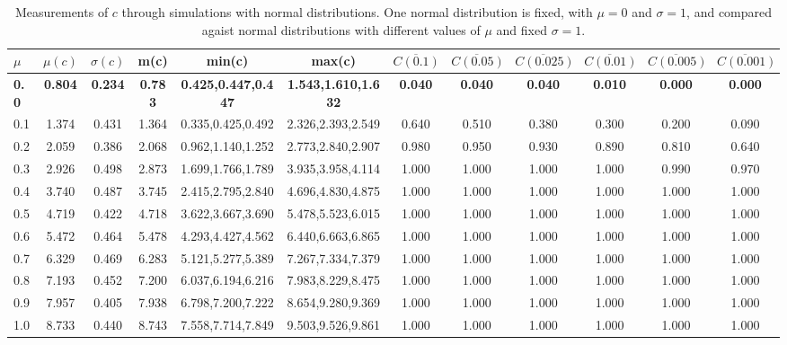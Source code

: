 \begin{table*}[h!]
\begin{center}
\begin{tabular}{| l | c | c | c | c | c | c | c | c | c | c | c |}\hline
$\mu$ & $\mu(c)$ & $\sigma(c)$ & m(c) & min(c) & max(c) & $\overline{C(0.1)}$ & $\overline{C(0.05)}$ & $\overline{C(0.025)}$ & $\overline{C(0.01)}$ & $\overline{C(0.005)}$ & $\overline{C(0.001)}$ \\\hline\hline
{\bf 0.0} & {\bf 0.804} & {\bf 0.234} & {\bf 0.783} & {\bf 0.425,0.447,0.447} & {\bf 1.543,1.610,1.632} & {\bf 0.040} & {\bf 0.040} & {\bf 0.040} & {\bf 0.010} & {\bf 0.000} & {\bf 0.000} \\\hline
0.1 & 1.374 & 0.431 & 1.364 & 0.335,0.425,0.492 & 2.326,2.393,2.549  & 0.640  & 0.510  & 0.380  & 0.300  & 0.200  & 0.090 \\\hline
0.2 & 2.059 & 0.386 & 2.068 & 0.962,1.140,1.252 & 2.773,2.840,2.907  & 0.980  & 0.950  & 0.930  & 0.890  & 0.810  & 0.640 \\\hline
0.3 & 2.926 & 0.498 & 2.873 & 1.699,1.766,1.789 & 3.935,3.958,4.114  & 1.000  & 1.000  & 1.000  & 1.000  & 0.990  & 0.970 \\\hline
0.4 & 3.740 & 0.487 & 3.745 & 2.415,2.795,2.840 & 4.696,4.830,4.875  & 1.000  & 1.000  & 1.000  & 1.000  & 1.000  & 1.000 \\\hline
0.5 & 4.719 & 0.422 & 4.718 & 3.622,3.667,3.690 & 5.478,5.523,6.015  & 1.000  & 1.000  & 1.000  & 1.000  & 1.000  & 1.000 \\\hline
0.6 & 5.472 & 0.464 & 5.478 & 4.293,4.427,4.562 & 6.440,6.663,6.865  & 1.000  & 1.000  & 1.000  & 1.000  & 1.000  & 1.000 \\\hline
0.7 & 6.329 & 0.469 & 6.283 & 5.121,5.277,5.389 & 7.267,7.334,7.379  & 1.000  & 1.000  & 1.000  & 1.000  & 1.000  & 1.000 \\\hline
0.8 & 7.193 & 0.452 & 7.200 & 6.037,6.194,6.216 & 7.983,8.229,8.475  & 1.000  & 1.000  & 1.000  & 1.000  & 1.000  & 1.000 \\\hline
0.9 & 7.957 & 0.405 & 7.938 & 6.798,7.200,7.222 & 8.654,9.280,9.369  & 1.000  & 1.000  & 1.000  & 1.000  & 1.000  & 1.000 \\\hline
1.0 & 8.733 & 0.440 & 8.743 & 7.558,7.714,7.849 & 9.503,9.526,9.861  & 1.000  & 1.000  & 1.000  & 1.000  & 1.000  & 1.000 \\\hline
\end{tabular}
\caption{Measurements of $c$ through simulations
with normal distributions.
One normal distribution is fixed, with $\mu=0$ and $\sigma=1$,
and compared agaist normal distributions with different values of $\mu$ and fixed $\sigma=1$.}
\end{center}
\end{table*}